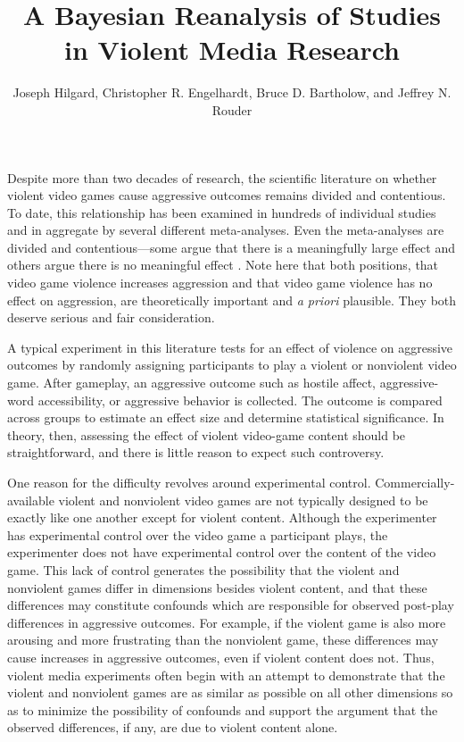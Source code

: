 \documentclass[man]{apa6}
\author{Joseph Hilgard, Christopher R. Engelhardt, Bruce D. Bartholow, and Jeffrey N. Rouder}
\title{A Bayesian Reanalysis of Studies in Violent Media Research}
\affiliation{University of Missouri - Columbia}
\begin{document}
\maketitle

Despite more than two decades of research, the scientific literature on whether violent video games cause aggressive outcomes remains divided and contentious. To date, this relationship has been examined in hundreds of individual studies and in aggregate by several different meta-analyses. Even the meta-analyses are divided and contentious---some argue that there is a meaningfully large effect \citep{Anderson:etal:2010,Greitemeyer:Mugge:2014} and others argue there is no meaningful effect \citep[e.g.,][]{Ferguson:Kilburn:2009,Sherry:2001}. Note here that both positions, that video game violence increases aggression and that video game violence has no effect on aggression, are theoretically important and {\em a priori} plausible.  They both deserve serious and fair consideration. 

A typical experiment in this literature tests for an effect of violence on aggressive outcomes by randomly assigning participants to play a violent or nonviolent video game. After gameplay, an aggressive outcome such as hostile affect, aggressive-word accessibility, or aggressive behavior is collected. The outcome is compared across groups to estimate an effect size and determine statistical significance.  In theory, then, assessing the effect of violent video-game content should be straightforward, and there is little reason to expect such controversy.

One reason for the difficulty revolves around experimental control.  Commercially-available violent and nonviolent video games are not typically designed to be exactly like one another except for violent content. Although the experimenter has experimental control over the video game a participant plays, the experimenter does not have experimental control over the content of the video game. This lack of control generates the possibility that the violent and nonviolent games differ in dimensions besides violent content, and that these differences may constitute confounds which are responsible for observed post-play differences in aggressive outcomes. For example, if the violent game is also more arousing and more frustrating than the nonviolent game, these differences may cause increases in aggressive outcomes, even if violent content does not. Thus, violent media experiments often begin with an attempt to demonstrate that the violent and nonviolent games are as similar as possible on all other dimensions so as to minimize the possibility of confounds and support the argument that the observed differences, if any, are due to violent content alone.
\end{document}
